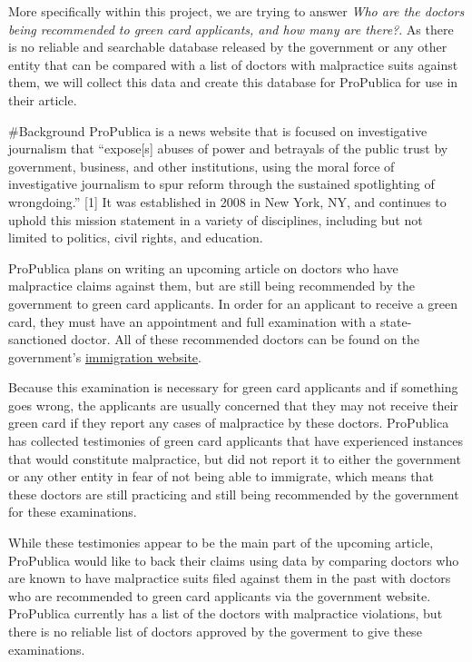 \documentclass[10pt,letterpaper]{article}
\begin{document}
More specifically within this project, we are trying to answer \emph{Who
are the doctors being recommended to green card applicants, and how many
are there?}. As there is no reliable and searchable database released by
the government or any other entity that can be compared with a list of
doctors with malpractice suits against them, we will collect this data
and create this database for ProPublica for use in their article.

\#Background ProPublica is a news website that is focused on
investigative journalism that ``expose{[}s{]} abuses of power and
betrayals of the public trust by government, business, and other
institutions, using the moral force of investigative journalism to spur
reform through the sustained spotlighting of wrongdoing.'' {[}1{]} It
was established in 2008 in New York, NY, and continues to uphold this
mission statement in a variety of disciplines, including but not limited
to politics, civil rights, and education.

ProPublica plans on writing an upcoming article on doctors who have
malpractice claims against them, but are still being recommended by the
government to green card applicants. In order for an applicant to
receive a green card, they must have an appointment and full examination
with a state-sanctioned doctor. All of these recommended doctors can be
found on the government's \href{my.uscis.gov/findadoctor}{immigration
website}.

Because this examination is necessary for green card applicants and if
something goes wrong, the applicants are usually concerned that they may
not receive their green card if they report any cases of malpractice by
these doctors. ProPublica has collected testimonies of green card
applicants that have experienced instances that would constitute
malpractice, but did not report it to either the government or any other
entity in fear of not being able to immigrate, which means that these
doctors are still practicing and still being recommended by the
government for these examinations.

While these testimonies appear to be the main part of the upcoming
article, ProPublica would like to back their claims using data by
comparing doctors who are known to have malpractice suits filed against
them in the past with doctors who are recommended to green card
applicants via the government website. ProPublica currently has a list
of the doctors with malpractice violations, but there is no reliable
list of doctors approved by the goverment to give these examinations.
\end{document}
